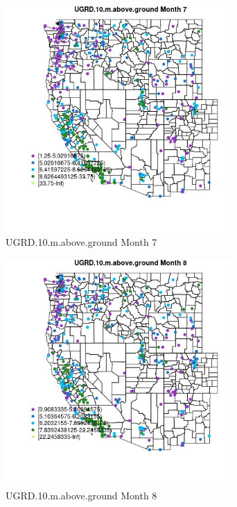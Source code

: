 \begin{figure} 
\centering  
\includegraphics[width=0.77\textwidth]{Code_Outputs/ML_input_report_ML_input_PM25_Step5_part_d_de_duplicated_aves_ML_input_MapObsMo7UGRD10maboveground.jpg} 
\caption{\label{fig:ML_input_report_ML_input_PM25_Step5_part_d_de_duplicated_aves_ML_inputMapObsMo7UGRD10maboveground}UGRD.10.m.above.ground Month 7} 
\end{figure} 
 

\begin{figure} 
\centering  
\includegraphics[width=0.77\textwidth]{Code_Outputs/ML_input_report_ML_input_PM25_Step5_part_d_de_duplicated_aves_ML_input_MapObsMo8UGRD10maboveground.jpg} 
\caption{\label{fig:ML_input_report_ML_input_PM25_Step5_part_d_de_duplicated_aves_ML_inputMapObsMo8UGRD10maboveground}UGRD.10.m.above.ground Month 8} 
\end{figure} 
 

